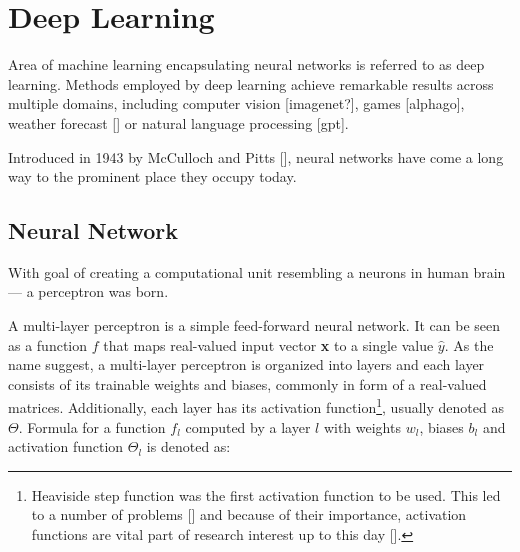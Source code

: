 
\section{Deep Learning}

Area of machine learning encapsulating neural networks is referred to as deep learning. Methods employed by deep learning achieve remarkable results across multiple domains, including computer vision [imagenet?], games [alphago], weather forecast [] or natural language processing [gpt].

Introduced in 1943 by McCulloch and Pitts [], neural networks have come a long way to the prominent place they occupy today.



\subsection{Neural Network}

With goal of creating a computational unit resembling a neurons in human brain --- a perceptron was born. 

A multi-layer perceptron is a simple feed-forward neural network. It can be seen as a function $f$ that maps real-valued input vector \textbf{x} to a single value $\hat{y}$. As the name suggest, a multi-layer perceptron is organized into layers and each layer consists of its trainable weights and biases, commonly in form of a real-valued matrices. Additionally, each layer has its activation function\footnote{Heaviside step function was the first activation function to be used. This led to a number of problems [] and because of their importance, activation functions are vital part of research interest up to this day [].}, usually denoted as $\Theta$. Formula for a function $f_l$ computed by a layer $l$ with weights $w_l$, biases $b_l$ and activation function $\Theta_l$ is denoted as:

